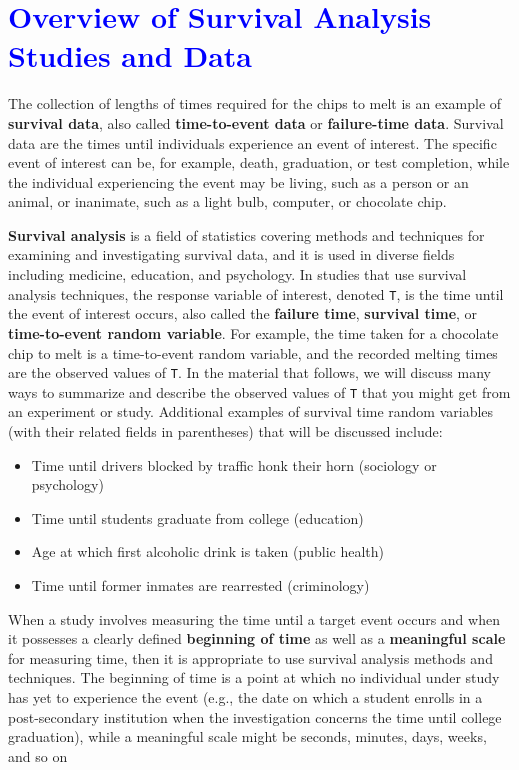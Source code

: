 \documentclass[
]{report}
\providecommand{\tightlist}{%
  \setlength{\itemsep}{0pt}\setlength{\parskip}{0pt}}
\begin{document}
\hypertarget{section-78}{%
\section{\texorpdfstring{\textcolor{blue}{Overview of Survival Analysis Studies and Data}}{}}\label{section-78}}

The collection of lengths of times required for the chips to melt is an example of \textbf{survival data}, also called \textbf{time-to-event data} or \textbf{failure-time data}. Survival data are the times until individuals experience an event of interest. The specific event of interest can be, for example, death, graduation, or test completion, while the individual experiencing the event may be living, such as a person or an animal, or inanimate, such as a light bulb, computer, or chocolate chip.

\textbf{Survival analysis} is a field of statistics covering methods and techniques for examining and investigating survival data, and it is used in diverse fields including medicine, education, and psychology. In studies that use survival analysis techniques, the response variable of interest, denoted \texttt{T}, is the time until the event of interest occurs, also called the \textbf{failure time}, \textbf{survival time}, or \textbf{time-to-event random variable}. For example, the time taken for a chocolate chip to melt is a time-to-event random variable, and the recorded melting times are the observed values of \texttt{T}. In the material that follows, we will discuss many ways to summarize and describe the observed values of \texttt{T} that you might get from an experiment or study. Additional examples of survival time random variables (with their related fields in parentheses) that will be discussed include:

\begin{itemize}
\tightlist
\item
  Time until drivers blocked by traffic honk their horn (sociology or psychology)\\
\item
  Time until students graduate from college (education)\\
\item
  Age at which first alcoholic drink is taken (public health)\\
\item
  Time until former inmates are rearrested (criminology)
\end{itemize}

When a study involves measuring the time until a target event occurs and when it possesses a clearly
defined \textbf{beginning of time} as well as a \textbf{meaningful scale} for measuring time, then it is appropriate to use
survival analysis methods and techniques. The beginning of time is a point at which no individual under study
has yet to experience the event (e.g., the date on which a student enrolls in a post-secondary institution when
the investigation concerns the time until college graduation), while a meaningful scale might be seconds,
minutes, days, weeks, and so on
\end{document}
